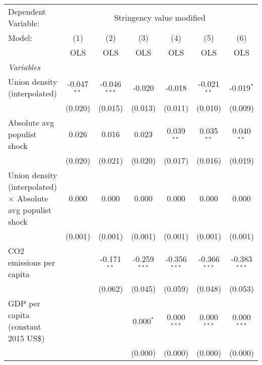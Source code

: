 
\begingroup
\centering
\begin{tabular}{lcccccc}
   \toprule
   Dependent Variable: & \multicolumn{6}{c}{Stringency value modified}\\
   Model:                                                             & (1)           & (2)            & (3)            & (4)            & (5)            & (6)\\  
                                                                      &  OLS          & OLS            & OLS            & OLS            & OLS            & OLS\\  
   \midrule
   \emph{Variables}\\
   Union density (interpolated)                                       & -0.047$^{**}$ & -0.046$^{***}$ & -0.020         & -0.018         & -0.021$^{**}$  & -0.019$^{*}$\\   
                                                                      & (0.020)       & (0.015)        & (0.013)        & (0.011)        & (0.010)        & (0.009)\\   
   Absolute avg populist shock                                        & 0.026         & 0.016          & 0.023          & 0.039$^{**}$   & 0.035$^{**}$   & 0.040$^{**}$\\   
                                                                      & (0.020)       & (0.021)        & (0.020)        & (0.017)        & (0.016)        & (0.019)\\   
   Union density (interpolated) $\times$ Absolute avg populist shock  & 0.000         & 0.000          & 0.000          & 0.000          & 0.000          & 0.000\\   
                                                                      & (0.001)       & (0.001)        & (0.001)        & (0.001)        & (0.001)        & (0.001)\\   
   CO2 emissions per capita                                           &               & -0.171$^{**}$  & -0.259$^{***}$ & -0.356$^{***}$ & -0.366$^{***}$ & -0.383$^{***}$\\   
                                                                      &               & (0.062)        & (0.045)        & (0.059)        & (0.048)        & (0.053)\\   
   GDP per capita (constant 2015 US\$)                                &               &                & 0.000$^{*}$    & 0.000$^{***}$  & 0.000$^{***}$  & 0.000$^{***}$\\   
                                                                      &               &                & (0.000)        & (0.000)        & (0.000)        & (0.000)\\   

\end{tabular}
